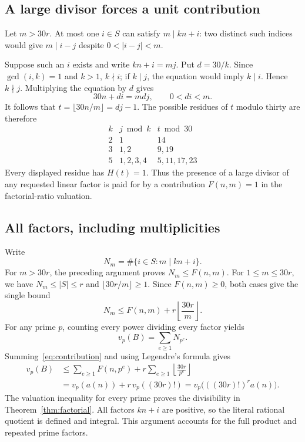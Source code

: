\documentclass[11pt]{article}
\begin{document}
\subsection{A large divisor forces a unit contribution}

Let $m>30r$. At most one $i\in S$ can satisfy $m\mid kn+i$:
two distinct such indices would give $m\mid i-j$ despite
$0<|i-j|<m$.

Suppose such an $i$ exists and write $kn+i=mj$. Put $d=30/k$.
Since $\gcd(i,k)=1$ and $k>1$, $k\nmid i$; if $k\mid j$,
the equation would imply $k\mid i$. Hence $k\nmid j$.
Multiplying the equation by $d$ gives
\[
30n+di=mdj,\qquad 0<di<m.
\]
It follows that $t=\lfloor30n/m\rfloor=dj-1$. The possible
residues of $t$ modulo thirty are therefore
\[
\begin{array}{c|c|c}
k&j\bmod k&t\bmod30\\\hline
2&1&14\\
3&1,2&9,19\\
5&1,2,3,4&5,11,17,23
\end{array}
\]
Every displayed residue has $H(t)=1$. Thus the presence of a
large divisor of any requested linear factor is paid for by a
contribution $F(n,m)=1$ in the factorial-ratio valuation.

\subsection{All factors, including multiplicities}

Write
\[
N_m=\#\{i\in S:m\mid kn+i\}.
\]
For $m>30r$, the preceding argument proves $N_m\le F(n,m)$.
For $1\le m\le30r$, we have $N_m\le|S|\le r$ and
$\lfloor30r/m\rfloor\ge1$. Since $F(n,m)\ge0$, both cases give
the single bound
\begin{equation}\label{eq:contribution}
N_m\le F(n,m)+r\left\lfloor\frac{30r}{m}\right\rfloor.
\end{equation}
For any prime $p$, counting every power dividing every factor yields
\[
v_p(B)=\sum_{e\ge1}N_{p^e}.
\]
Summing~\eqref{eq:contribution} and using Legendre's formula gives
\[
\begin{aligned}
v_p(B)
&\le\sum_{e\ge1}F(n,p^e)
+r\sum_{e\ge1}\left\lfloor\frac{30r}{p^e}\right\rfloor\\
&=v_p(a(n))+r\,v_p((30r)!)
=v_p\bigl(((30r)!)^r a(n)\bigr).
\end{aligned}
\]
The valuation inequality for every prime proves the divisibility
in Theorem~\ref{thm:factorial}. All factors $kn+i$ are positive,
so the literal rational quotient is defined and integral. This
argument accounts for the full product and repeated prime factors.
\end{document}
